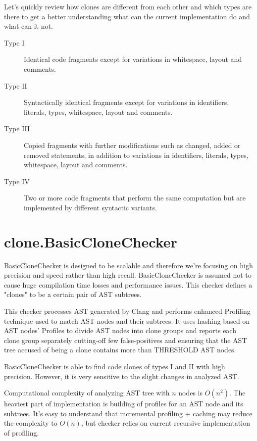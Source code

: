 \documentclass[a0,portrait]{a0poster}
\begin{document}
\begin{multicols}{2}
Let's quickly review how clones are different from each other and which types are there
to get a better understanding what can the current implementation do and what can it not.

\begin{description}
  \item[Type I] Identical code fragments except for variations in whitespace, layout and
  comments.
  \item[Type II] Syntactically identical fragments except for variations in identifiers,
  literals, types, whitespace, layout and comments.
  \item[Type III] Copied fragments with further modifications such as changed, added or
  removed statements, in addition to variations in identifiers, literals, types,
  whitespace, layout and comments.
  \item[Type IV] Two or more code fragments that perform the same computation but are
  implemented by different syntactic variants.
\end{description}


\section*{clone.BasicCloneChecker}

BasicCloneChecker is designed to be scalable and therefore we're focusing on high
precision and speed rather than high recall. BasicCloneChecker is assumed not to cause
huge compilation time losses and performance issues. This checker defines a "clones"
to be a certain pair of AST subtrees.

This checker processes AST generated by Clang and performs enhanced Profiling technique
used to match AST nodes and their subtrees. It uses hashing based on AST nodes'
Profiles to divide AST nodes into clone groups and reports each clone group separately
cutting-off few false-positives and ensuring that the AST tree accused of being a clone
contains more than THRESHOLD AST nodes.

BasicCloneChecker is able to find code clones of types I and II with high precision.
However, it is very sensitive to the slight changes in analyzed AST.

Computational complexity of analyzing AST tree with $n$ nodes is $O(n^2)$. The heaviest
part of implementation is building of profiles for an AST node and its subtrees. It's
easy to understand that incremental profiling + caching may reduce the complexity to
$O(n)$, but checker relies on current recursive implementation of profiling.


\end{multicols}
\end{document}
